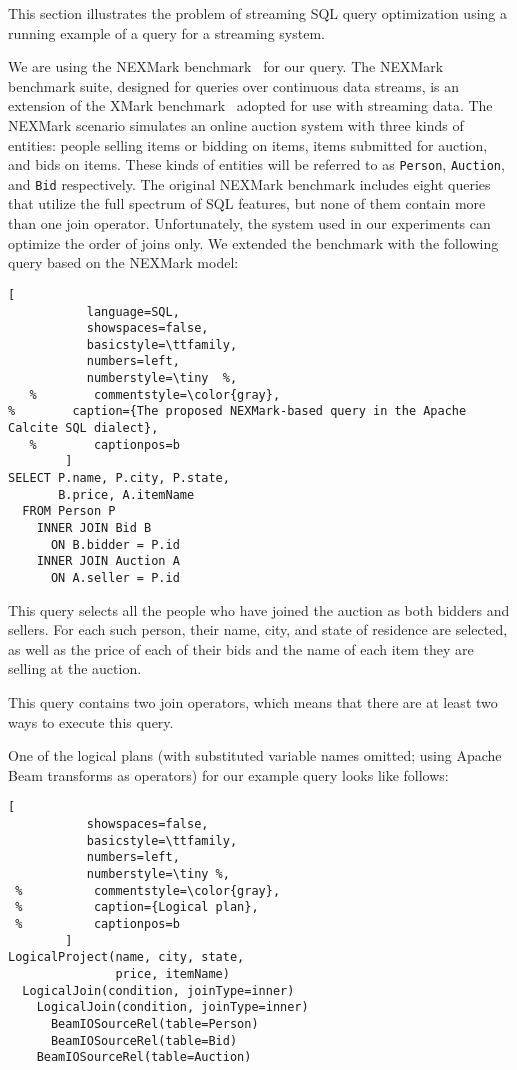 \label {sec:fs-optimization-problem-statement}

This section illustrates the problem of streaming SQL query optimization using a running example of a query for a streaming system.

We are using the NEXMark benchmark~\cite{tucker2008nexmark} for our query. The NEXMark benchmark suite, designed for queries over continuous data streams, is an extension of the XMark benchmark~\cite{schmidt2002xmark} adopted for use with streaming data. 
The NEXMark scenario simulates an online auction system with three kinds of entities: people selling items or bidding on items, items submitted for auction, and bids on items. 
These kinds of entities will be referred to as \texttt{Person}, \texttt{Auction}, and \texttt{Bid} respectively. 
The original NEXMark benchmark includes eight queries that utilize the full spectrum of SQL features, but none of them contain more than one join operator.  Unfortunately, the system used in our experiments can optimize the order of joins only. 
We extended the benchmark with  the following query based on the NEXMark model:  



\begin{lstlisting}[
           language=SQL,
           showspaces=false,
           basicstyle=\ttfamily,
           numbers=left,
           numberstyle=\tiny  %,
   %        commentstyle=\color{gray},
%        caption={The proposed NEXMark-based query in the Apache Calcite SQL dialect}, 
   %        captionpos=b
        ]
SELECT P.name, P.city, P.state, 
       B.price, A.itemName 
  FROM Person P 
    INNER JOIN Bid B 
      ON B.bidder = P.id 
    INNER JOIN Auction A 
      ON A.seller = P.id
\end{lstlisting}

This query selects all the people who have joined the auction as both bidders and sellers. 
For each such person, their name, city, and state of residence are selected, as well as the price of each of their bids and the name of each item they are selling at the auction. 

This query contains two join operators, which means that there are at least two ways to execute this query.

One of the logical   plans (with substituted variable names omitted; using Apache Beam transforms as operators) for our example query looks like  follows: 

\begin{lstlisting}[
           showspaces=false,
           basicstyle=\ttfamily,
           numbers=left,
           numberstyle=\tiny %,
 %          commentstyle=\color{gray},
 %          caption={Logical plan}, 
 %          captionpos=b
        ]
LogicalProject(name, city, state, 
               price, itemName)
  LogicalJoin(condition, joinType=inner) 
    LogicalJoin(condition, joinType=inner)
      BeamIOSourceRel(table=Person)
      BeamIOSourceRel(table=Bid)
    BeamIOSourceRel(table=Auction)
\end{lstlisting}

